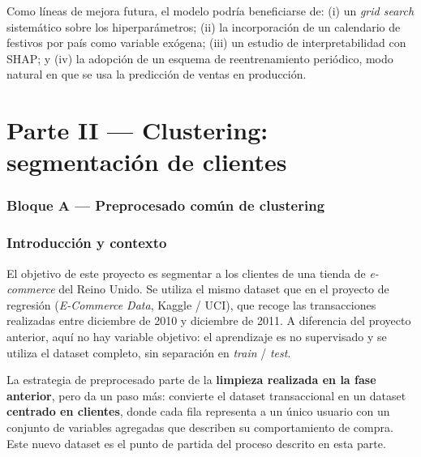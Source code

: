 \documentclass[11pt,a4paper]{article}
\begin{document}
Como líneas de mejora futura, el modelo podría beneficiarse de: (i) un \textit{grid search} sistemático sobre los hiperparámetros; (ii) la incorporación de un calendario de festivos por país como variable exógena; (iii) un estudio de interpretabilidad con SHAP; y (iv) la adopción de un esquema de reentrenamiento periódico, modo natural en que se usa la predicción de ventas en producción.


\newpage
\part*{\textcolor{azultfm}{Parte II — Clustering: segmentación de clientes}}
\vspace{0.5cm}

\section*{\textcolor{tealtfm}{Bloque A — Preprocesado común de clustering}}

\section{Introducción y contexto}

El objetivo de este proyecto es segmentar a los clientes de una tienda de \textit{e-commerce} del Reino Unido. Se utiliza el mismo dataset que en el proyecto de regresión (\textit{E-Commerce Data}, Kaggle / UCI), que recoge las transacciones realizadas entre diciembre de 2010 y diciembre de 2011. A diferencia del proyecto anterior, aquí no hay variable objetivo: el aprendizaje es no supervisado y se utiliza el dataset completo, sin separación en \textit{train} / \textit{test}.

La estrategia de preprocesado parte de la \textbf{limpieza realizada en la fase anterior}, pero da un paso más: convierte el dataset transaccional en un dataset \textbf{centrado en clientes}, donde cada fila representa a un único usuario con un conjunto de variables agregadas que describen su comportamiento de compra. Este nuevo dataset es el punto de partida del proceso descrito en esta parte.
\end{document}

